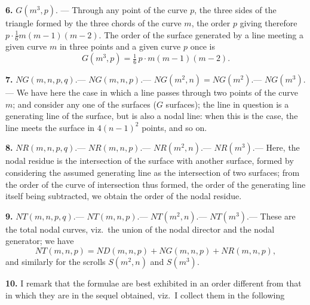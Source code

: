\documentclass[11pt,a4paper]{article}
\begin{document}
\medskip

\noindent \textbf{6.} $G(m^3, p)$. --- Through any point of the curve $p$, the three sides of the triangle formed by the three chords of the curve $m$, the order $p$ giving therefore $p \cdot \frac{1}{6}m(m-1)(m-2)$. The order of the surface generated by a line meeting a given curve $m$ in three points and a given curve $p$ once is
\[
G(m^3, p) = \tfrac{1}{6}\, p \cdot m(m-1)(m-2).
\]

\medskip

\noindent \textbf{7.} $NG(m, n, p, q)$.--- $NG(m, n, p)$.--- $NG(m^2, n) = NG(m^2)$.--- $NG(m^3)$.--- We have here the case in which a line passes through two points of the curve $m$; and consider any one of the surfaces ($G$ surfaces); the line in question is a generating line of the surface, but is also a nodal line: when this is the case, the line meets the surface in $4(n-1)^2$ points, and so on.

\medskip

\noindent \textbf{8.} $NR(m, n, p, q)$.--- $NR(m, n, p)$.--- $NR(m^2, n)$.--- $NR(m^3)$.--- Here, the nodal residue is the intersection of the surface with another surface, formed by considering the assumed generating line as the intersection of two surfaces; from the order of the curve of intersection thus formed, the order of the generating line itself being subtracted, we obtain the order of the nodal residue.

\medskip

\noindent \textbf{9.} $NT(m, n, p, q)$.--- $NT(m, n, p)$.--- $NT(m^2, n)$.--- $NT(m^3)$.--- These are the total nodal curves, viz.\ the union of the nodal director and the nodal generator; we have
\[
NT(m, n, p) = ND(m, n, p) + NG(m, n, p) + NR(m, n, p),
\]
and similarly for the scrolls $S(m^2, n)$ and $S(m^3)$.

\medskip

\noindent \textbf{10.} I remark that the formulae are best exhibited in an order different from that in which they are in the sequel obtained, viz.\ I collect them in the following
\end{document}
